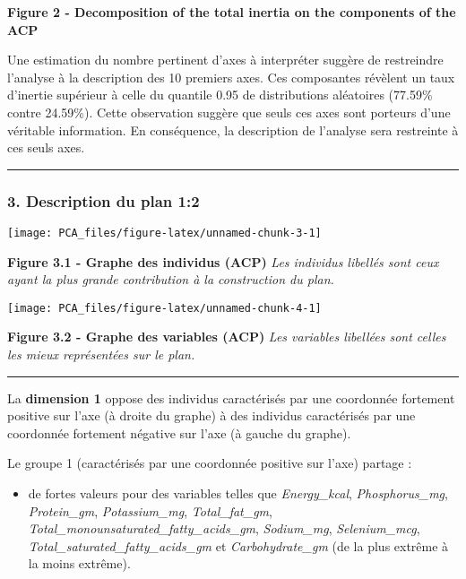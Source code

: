 \documentclass[]{article}
\providecommand{\tightlist}{%
  \setlength{\itemsep}{0pt}\setlength{\parskip}{0pt}}
\begin{document}
\textbf{Figure 2 - Decomposition of the total inertia on the components
of the ACP}

Une estimation du nombre pertinent d'axes à interpréter suggère de
restreindre l'analyse à la description des 10 premiers axes. Ces
composantes révèlent un taux d'inertie supérieur à celle du quantile
0.95 de distributions aléatoires (77.59\% contre 24.59\%). Cette
observation suggère que seuls ces axes sont porteurs d'une véritable
information. En conséquence, la description de l'analyse sera restreinte
à ces seuls axes.

\begin{center}\rule{0.5\linewidth}{\linethickness}\end{center}

\subsubsection{3. Description du plan 1:2}\label{description-du-plan-12}

\begin{center}\texttt{[image: PCA\_files/figure-latex/unnamed-chunk-3-1]} \end{center}

\textbf{Figure 3.1 - Graphe des individus (ACP)} \emph{Les individus
libellés sont ceux ayant la plus grande contribution à la construction
du plan.}

\begin{center}\texttt{[image: PCA\_files/figure-latex/unnamed-chunk-4-1]} \end{center}

\textbf{Figure 3.2 - Graphe des variables (ACP)} \emph{Les variables
libellées sont celles les mieux représentées sur le plan.}

\begin{center}\rule{0.5\linewidth}{\linethickness}\end{center}

La \textbf{dimension 1} oppose des individus caractérisés par une
coordonnée fortement positive sur l'axe (à droite du graphe) à des
individus caractérisés par une coordonnée fortement négative sur l'axe
(à gauche du graphe).

Le groupe 1 (caractérisés par une coordonnée positive sur l'axe) partage
:

\begin{itemize}
\tightlist
\item
  de fortes valeurs pour des variables telles que \emph{Energy\_kcal},
  \emph{Phosphorus\_mg}, \emph{Protein\_gm}, \emph{Potassium\_mg},
  \emph{Total\_fat\_gm},
  \emph{Total\_monounsaturated\_fatty\_acids\_gm}, \emph{Sodium\_mg},
  \emph{Selenium\_mcg}, \emph{Total\_saturated\_fatty\_acids\_gm} et
  \emph{Carbohydrate\_gm} (de la plus extrême à la moins extrême).
\end{itemize}
\end{document}
